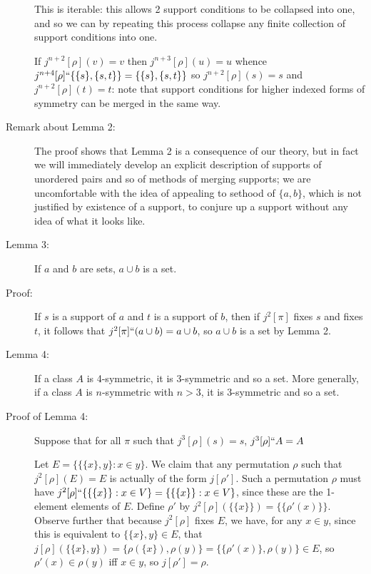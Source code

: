 \documentclass[12pt]{article}
\begin{document}
\begin{description}
This is iterable:  this allows 2 support conditions to be collapsed into one, and so we can by repeating this process collapse any finite collection of support conditions into one.

If $j^{n+2}[\rho](v)=v$ then $j^{n+3}[\rho](u) = u$ whence $j^{n+4}[\rho]``\{\{s\},\{s,t\}\}= \{\{s\},\{s,t\}\}$ so $j^{n+2}[\rho](s)=s$ and $j^{n+2}[\rho](t)=t$:  note that support conditions for higher indexed forms of symmetry can be merged in the same way.

\item[Remark about Lemma 2:]  The proof shows that Lemma 2 is a consequence of our theory, but
in fact we will immediately develop an explicit description of supports of unordered pairs and so of methods of merging supports;  we are uncomfortable with the idea of appealing to sethood of $\{a,b\}$, which is not justified by existence of a support, to conjure up a support without any idea of what it looks like.

\item[Lemma 3:]  If $a$ and $b$ are sets, $a \cup b$ is a set.

\item[Proof:]  If $s$ is a support of $a$ and $t$ is a support of $b$, then if $j^2[\pi]$ fixes $s$ and fixes $t$, it follows that $j^2[\pi]``(a \cup b) = a \cup b$, so $a \cup b$ is a set by Lemma 2.

\item[Lemma 4:]  If a class $A$ is 4-symmetric, it is 3-symmetric and so a set.  More generally, if a class $A$ is $n$-symmetric with $n>3$, it is 3-symmetric and so a set.

\item[Proof of Lemma 4:]  Suppose that for all $\pi$ such that $j^3[\rho](s)=s$, $j^3[\rho]``A =A$

Let $E = \{\{\{x\},y\}:x \in y\}$.  We claim that any permutation $\rho$ such that $j^2[\rho](E)=E$ is actually of the form $j[\rho']$.
Such a permutation $\rho$ must have $j^2[\rho]``\{\{\{x\}\}:x \in V\}= \{\{\{x\}\}:x \in V\}$, since these are the 1-element elements of $E$.
Define $\rho'$ by $j^2[\rho](\{\{x\}\}) = \{\{\rho'(x)\}\}$.  Observe further that because $j^2[\rho]$ fixes $E$, we have, for any $x \in y$, since this is equivalent to $\{\{x\},y\} \in E$,
that $j[\rho](\{\{x\},y\}) = \{\rho(\{x\}),\rho(y)\} = \{\{\rho'(x)\},\rho(y)\} \in E$, so $\rho'(x) \in \rho(y)$ iff $x \in y$, so $j[\rho']=\rho$.


\end{description}
\end{document}
